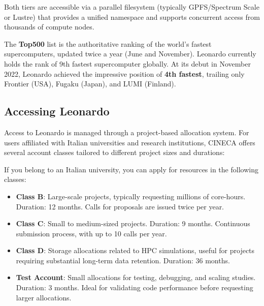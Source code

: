 Both tiers are accessible via a parallel filesystem (typically GPFS/Spectrum Scale or Lustre) that provides a unified namespace and supports concurrent access from thousands of compute nodes.

\begin{observationblock}[Top500]
    The \textbf{Top500} list is the authoritative ranking of the world's fastest supercomputers, updated twice a year (June and November). Leonardo currently holds the rank of 9th fastest supercomputer globally. At its debut in November 2022, Leonardo achieved the impressive position of \textbf{4th fastest}, trailing only Frontier (USA), Fugaku (Japan), and LUMI (Finland).

\end{observationblock}

\subsection{Accessing Leonardo}

Access to Leonardo is managed through a project-based allocation system. For users affiliated with Italian universities and research institutions, CINECA offers several account classes tailored to different project sizes and durations:

\begin{tipsblock}
    If you belong to an Italian university, you can apply for resources in the following classes:
    \begin{itemize}
        \item \textbf{Class B}: Large-scale projects, typically requesting millions of core-hours. Duration: 12 months. Calls for proposals are issued twice per year.
        \item \textbf{Class C}: Small to medium-sized projects. Duration: 9 months. Continuous submission process, with up to 10 calls per year.
        \item \textbf{Class D}: Storage allocations related to HPC simulations, useful for projects requiring substantial long-term data retention. Duration: 36 months.
        \item \textbf{Test Account}: Small allocations for testing, debugging, and scaling studies. Duration: 3 months. Ideal for validating code performance before requesting larger allocations.
    \end{itemize}
\end{tipsblock}

    \medskip

